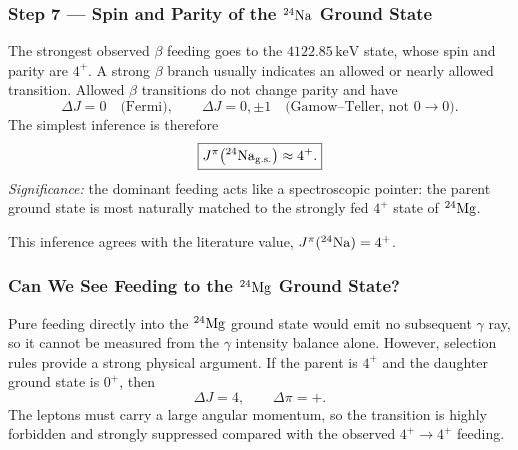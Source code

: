 \subsubsection*{Step 7 --- Spin and Parity of the $\nucleus{Na}{24}$ Ground State}
The strongest observed $\beta$ feeding goes to the $4122.85\,\text{keV}$ state,
whose spin and parity are $4^+$. A strong $\beta$ branch usually indicates an
allowed or nearly allowed transition. Allowed $\beta$ transitions do not change
parity and have
\begin{equation}
  \label{eq:lec10:allowed_beta_selection}
  \Delta J=0 \quad\text{(Fermi)},\qquad
  \Delta J=0,\pm1 \quad\text{(Gamow--Teller, not }0\to0\text{)}.
\end{equation}
The simplest inference is therefore
\begin{equation}
  \label{eq:lec10:na24_spin_parity}
  \boxed{J^\pi\bigl(\nucleus{Na}{24}_\text{g.s.}\bigr)\approx4^+.}
\end{equation}
\textit{Significance:} the dominant feeding acts like a spectroscopic pointer:
the parent ground state is most naturally matched to the strongly fed $4^+$
state of $\nucleus{Mg}{24}$.

This inference agrees with the literature value, $J^\pi(\nucleus{Na}{24})=4^+$.

\subsubsection*{Can We See Feeding to the $\nucleus{Mg}{24}$ Ground State?}
Pure feeding directly into the $\nucleus{Mg}{24}$ ground state would emit no
subsequent $\gamma$ ray, so it cannot be measured from the $\gamma$ intensity
balance alone. However, selection rules provide a strong physical argument. If
the parent is $4^+$ and the daughter ground state is $0^+$, then
\begin{equation}
  \label{eq:lec10:ground_state_delta_j}
  \Delta J=4,\qquad \Delta\pi=+.
\end{equation}
The leptons must carry a large angular momentum, so the transition is highly
forbidden and strongly suppressed compared with the observed $4^+\to4^+$
feeding.


